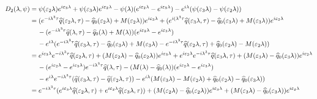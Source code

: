 \begin{align*}
    D_2(\lambda, \psi) &= \psi(\varepsilon_2\lambda)e^{i \varepsilon_3\lambda} + \psi(\varepsilon_3\lambda)e^{i \varepsilon_2\lambda} -\psi(\lambda)( e^{i\varepsilon_2\lambda} - e^{i\varepsilon_3\lambda}) -e^{i\lambda}(\psi(\varepsilon_3\lambda) - \psi(\varepsilon_2\lambda)) \\
    &= (e^{-i \lambda^3 \tau}\widehat{q}(\varepsilon_2\lambda,\tau) - \widehat{q}_0(\varepsilon_2\lambda) + M(\varepsilon_2\lambda))e^{i \varepsilon_3\lambda} + (e^{i (\lambda^3 \tau}\widehat{q}(\varepsilon_3\lambda,\tau) - \widehat{q}_0(\varepsilon_3\lambda) + M(\varepsilon_3\lambda))e^{i \varepsilon_2\lambda}\\
    &\hspace{1pc}-(e^{-i \lambda^3 \tau}\widehat{q}(\lambda,\tau) - \widehat{q}_0(\lambda) + M(\lambda))( e^{i\varepsilon_2\lambda} - e^{i\varepsilon_3\lambda}) \\
    &\hspace{1pc}- e^{i\lambda}(e^{-i \lambda^3 \tau}\widehat{q}(\varepsilon_3\lambda,\tau) - \widehat{q}_0(\varepsilon_3\lambda) + M(\varepsilon_3\lambda) -e^{-i \lambda^3 \tau}\widehat{q}(\varepsilon_2\lambda,\tau) + \widehat{q}_0(\varepsilon_2\lambda) - M(\varepsilon_2\lambda)) \\
    &= e^{i \varepsilon_3\lambda} e^{-i \lambda^3 \tau}\widehat{q}(\varepsilon_2\lambda,\tau) + (M(\varepsilon_2\lambda) - \widehat{q}_0(\varepsilon_2\lambda))e^{i \varepsilon_3\lambda} + e^{i \varepsilon_2\lambda}e^{-i \lambda^3 \tau}\widehat{q}(\varepsilon_3\lambda,\tau) +(M(\varepsilon_3\lambda) - \widehat{q}_0(\varepsilon_3\lambda))e^{i \varepsilon_2\lambda}\\
    &\hspace{1pc}-(e^{i\varepsilon_2\lambda} - e^{i\varepsilon_3\lambda}) e^{-i \lambda^3 \tau}\widehat{q}(\lambda,\tau)-( M(\lambda) - \widehat{q}_0(\lambda))(e^{i\varepsilon_2\lambda} - e^{i\varepsilon_3\lambda}) \\
    &\hspace{1pc}- e^{i\lambda}e^{-i \lambda^3 \tau}(\widehat{q}(\varepsilon_3\lambda,\tau) - \widehat{q}(\varepsilon_2\lambda,\tau))  - e^{i\lambda} (M(\varepsilon_3\lambda) - M(\varepsilon_2\lambda)+ \widehat{q}_0(\varepsilon_2\lambda) - \widehat{q}_0(\varepsilon_3\lambda)) \\
    &= e^{-i \lambda^3 \tau} (e^{i \varepsilon_3\lambda} \widehat{q}(\varepsilon_2\lambda,\tau) + e^{i \varepsilon_2\lambda}\widehat{q}(\varepsilon_3\lambda,\tau))+ (M(\varepsilon_2\lambda) - \widehat{q}_0(\varepsilon_2\lambda))e^{i \varepsilon_3\lambda} +(M(\varepsilon_3\lambda) - \widehat{q}_0(\varepsilon_3\lambda))e^{i \varepsilon_2\lambda}\\

\end{align*}
